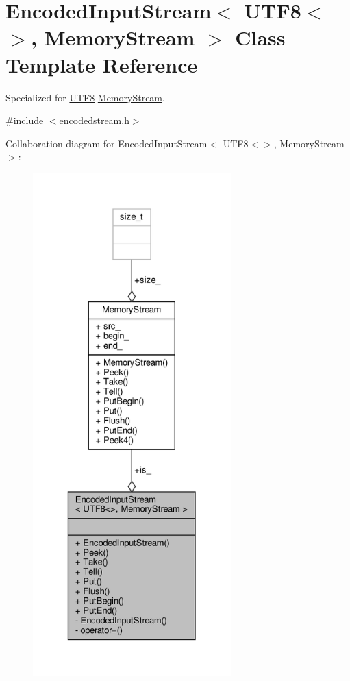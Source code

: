 \hypertarget{classEncodedInputStream_3_01UTF8_3_4_00_01MemoryStream_01_4}{}\section{Encoded\+Input\+Stream$<$ U\+T\+F8$<$$>$, Memory\+Stream $>$ Class Template Reference}
\label{classEncodedInputStream_3_01UTF8_3_4_00_01MemoryStream_01_4}


Specialized for \hyperlink{structUTF8}{U\+T\+F8} \hyperlink{structMemoryStream}{Memory\+Stream}.  




{\ttfamily \#include $<$encodedstream.\+h$>$}



Collaboration diagram for Encoded\+Input\+Stream$<$ U\+T\+F8$<$$>$, Memory\+Stream $>$\+:
\nopagebreak
\begin{figure}[H]
\begin{center}
\leavevmode
\includegraphics[height=550pt]{classEncodedInputStream_3_01UTF8_3_4_00_01MemoryStream_01_4__coll__graph}
\end{center}
\end{figure}
